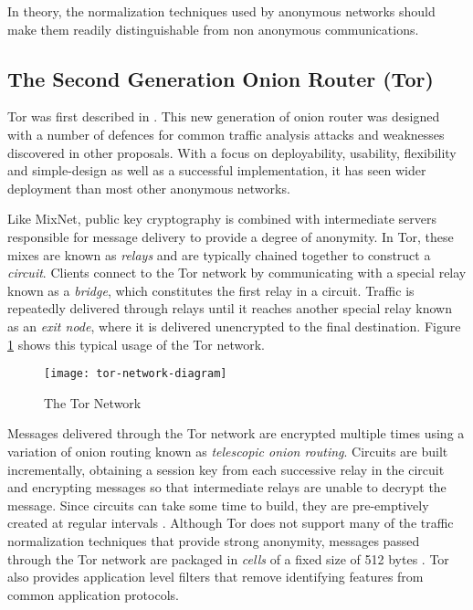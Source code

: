 \documentclass{ecuthesis}
\begin{document}
In theory, the normalization techniques used by anonymous networks should make
them readily distinguishable from non anonymous communications.

\subsection{The Second Generation Onion Router (Tor)}

Tor was first described in 
\parencite{Dingledine:2004p314}. This new generation of onion router was
designed with a number of defences for common traffic analysis attacks and
weaknesses discovered in other proposals. With a focus on deployability,
usability, flexibility and simple-design \parencite[3-4]{Dingledine:2004p314}
as well as a successful implementation, it has seen wider deployment than most
other anonymous networks.

Like MixNet, public key cryptography is combined with intermediate servers
responsible for message delivery to provide a degree of anonymity. In Tor,
these mixes are known as \emph{relays} and are typically chained together to
construct a \emph{circuit}. Clients connect to the Tor network by communicating
with a special relay known as a \emph{bridge}, which constitutes the first
relay in a circuit. Traffic is repeatedly delivered through relays until it
reaches another special relay known as an \emph{exit node}, where it is
delivered unencrypted to the final destination. Figure \ref{tor-network} shows
this typical usage of the Tor network.

\begin{figure}[H]
  \centering\texttt{[image: tor-network-diagram]}
  \caption{The Tor Network}
  \label{tor-network}
\end{figure}

Messages delivered through the Tor network are encrypted multiple times using a
variation of onion routing \parencite{Michael:2001} known as \emph{telescopic
onion routing}. Circuits are built incrementally, obtaining a session key from
each successive relay in the circuit and encrypting messages so that
intermediate relays are unable to decrypt the message. Since circuits can take
some time to build, they are pre-emptively created at regular intervals
\parencite[p. 5]{Dingledine:2004p314}. Although Tor does not support many of
the traffic normalization techniques that provide strong anonymity, messages
passed through the Tor network are packaged in \emph{cells} of a fixed size of
512 bytes \parencite[p. 5]{Dingledine:2004p314}. Tor also provides application
level filters that remove identifying features from common application
protocols.
\end{document}

